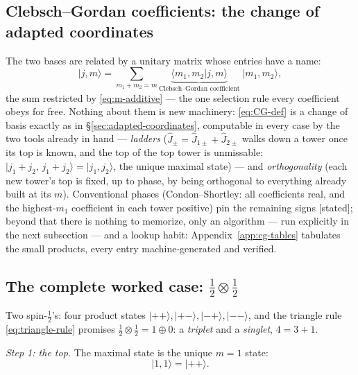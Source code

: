 \documentclass[11pt]{article}
\theoremstyle{plain}
\theoremstyle{definition}
\theoremstyle{remark}
\newcommand{\op}[1]{\hat{#1}}
\newcommand{\ket}[1]{\lvert #1 \rangle}
\newcommand{\braket}[2]{\langle #1 | #2 \rangle}
\begin{document}
\subsection{Clebsch--Gordan coefficients: the change of adapted
coordinates}\label{sec:CG}

The two bases are related by a unitary matrix whose entries have a
name:
\begin{equation}
  \ket{j, m}
  = \sum_{m_1 + m_2 = m}
    \underbrace{\braket{m_1, m_2}{j, m}}_{\text{Clebsch--Gordan
    coefficient}}
    \;\ket{m_1, m_2},
  \label{eq:CG-def}
\end{equation}
the sum restricted by \eqref{eq:m-additive} --- the one selection
rule every coefficient obeys for free. Nothing about them is new
machinery: \eqref{eq:CG-def} is a change of basis exactly as in
\S\ref{sec:adapted-coordinates}, computable in every case by the
two tools already in hand --- \emph{ladders} ($\op J_\pm =
\op J_{1\pm} + \op J_{2\pm}$ walks down a tower once its top is
known, and the top of the top tower is unmissable:
$\ket{j_1 + j_2,\, j_1 + j_2} = \ket{j_1, j_2}$, the unique maximal
state) --- and \emph{orthogonality} (each new tower's top is fixed,
up to phase, by being orthogonal to everything already built at its
$m$). Conventional phases (Condon--Shortley: all coefficients real,
and the highest-$m_1$ coefficient in each tower positive) pin the
remaining signs [stated]; beyond that there is nothing to memorize,
only an algorithm --- run explicitly in the next subsection --- and
a lookup habit: Appendix~\ref{app:cg-tables} tabulates the small
products, every entry machine-generated and verified.

\subsection{The complete worked case: $\tfrac12 \otimes \tfrac12$}\label{sec:half-half}

Two spin-$\tfrac12$'s: four product states $\ket{++}, \ket{+-},
\ket{-+}, \ket{--}$, and the triangle rule
\eqref{eq:triangle-rule} promises $\tfrac12\otimes\tfrac12 = 1
\oplus 0$: a \emph{triplet} and a \emph{singlet}, $4 = 3 + 1$.

\emph{Step 1: the top.} The maximal state is the unique $m = 1$
state:
\begin{equation}
  \ket{1, 1} = \ket{++}.
\end{equation}
\end{document}
